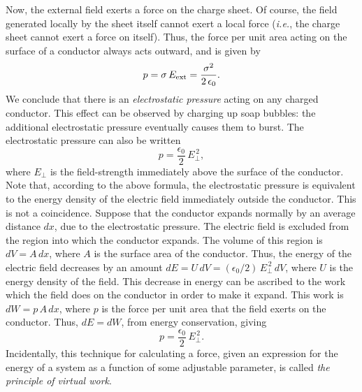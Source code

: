 Now, the external field exerts a force on the charge sheet. Of course, the field generated locally
by
the sheet itself  cannot exert a local force ({\em i.e.}, the charge sheet cannot exert
a force on itself). Thus, the force per unit area acting on the surface of a
conductor always acts outward, and is given by
\begin{equation}
p = \sigma \,E_{\rm ext} = \frac{\sigma^2}{2\,\epsilon_0}.
\end{equation}
We conclude that there is an {\em electrostatic pressure}\/ acting on any charged conductor.
This effect can be observed by charging up soap bubbles: the additional
electrostatic pressure eventually causes them to burst. The electrostatic pressure
can also be written
\begin{equation}
p = \frac{\epsilon_0}{2} \,E_\perp^{\,2},
\end{equation}
where $E_\perp$ is the field-strength immediately above the surface of the conductor.
Note that, according to the above formula, the electrostatic pressure is equivalent
to the energy density of the electric field immediately outside the conductor. 
This is not a coincidence. Suppose that the conductor expands normally by an average 
distance $dx$, due to the electrostatic pressure. The electric field is excluded
from the region into which the conductor expands. The volume of this region
is $dV = A \,dx$, where $A$ is the surface area of the conductor. Thus, the energy
of the electric field decreases by an amount $dE =  U\,dV = (\epsilon_0/2) \,E_\perp^{\,2}
\,dV$,
where $U$ is the energy density of the field. This decrease in energy can be 
ascribed to the work which the field does on the conductor in order to make it expand.
This work is $dW = p\,A\,dx$, where $p$ is the force per unit area that the field exerts
on the conductor. Thus, $dE = dW$, from energy conservation, giving
\begin{equation}
p = \frac{\epsilon_0}{2} \,E_\perp^{\,2}.
\end{equation}
Incidentally, this technique for calculating a force,  given an expression
for the  energy of a
system as a function of some adjustable parameter,
 is called {\em the principle of virtual work}.

